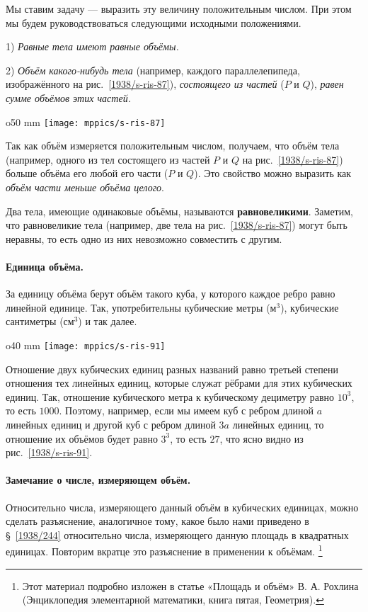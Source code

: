 Мы ставим задачу — выразить эту величину положительным числом.
При этом мы будем руководствоваться следующими исходными положениями.

1) \emph{Равные тела имеют равные объёмы.}

2) \emph{Объём какого-нибудь тела}
(например, каждого параллелепипеда, изображённого на рис.~\ref{1938/s-ris-87}),
\emph{состоящего из частей}
($P$ и $Q$),
\emph{равен сумме объёмов этих частей.}

\begin{wrapfigure}{o}{50 mm}
\vskip-0mm
\centering
\texttt{[image: mppics/s-ris-87]}
\caption{}\label{1938/s-ris-87}
\vskip-0mm
\end{wrapfigure}

Так как объём измеряется положительным числом, получаем, что 
объём тела (например, одного из тел состоящего из частей $P$ и $Q$ на рис.~\ref{1938/s-ris-87})
больше объёма его любой его части ($P$ и $Q$).
Это свойство можно выразить как \emph{объём части меньше объёма целого}.

Два тела, имеющие одинаковые объёмы, называются \textbf{равновеликими}.
Заметим, что равновеликие тела (например, две тела на рис.~\ref{1938/s-ris-87}) могут быть неравны, то есть одно из них невозможно совместить с другим.

\paragraph{Единица объёма.}\label{1938/s83}
За единицу объёма берут объём такого куба, у которого каждое ребро равно линейной единице.
Так, употребительны кубические метры (м$^3$), кубические сантиметры (см$^3$) и так далее.

\begin{wrapfigure}{o}{40 mm}
\vskip-0mm
\centering
\texttt{[image: mppics/s-ris-91]}
\caption{}\label{1938/s-ris-91}
\vskip-0mm
\end{wrapfigure}

Отношение двух кубических единиц разных названий равно третьей степени отношения тех линейных единиц, которые служат рёбрами для этих кубических единиц.
Так, отношение кубического метра к кубическому дециметру равно $10^3$, то есть $1000$.
Поэтому, например, если мы имеем куб с ребром длиной $a$ линейных единиц и другой куб с ребром длиной $3a$ линейных единиц, то отношение их объёмов будет равно $3^3$, то есть $27$, что ясно видно из рис.~\ref{1938/s-ris-91}.

\paragraph{Замечание о числе, измеряющем объём.}\label{1930/366}
Относительно числа, измеряющего данный объём в кубических единицах, можно сделать разъяснение, аналогичное тому, какое было нами приведено в §~\ref{1938/244}
относительно числа, измеряющего данную площадь в квадратных единицах.
Повторим вкратце это разъяснение в применении к объёмам.%
\footnote{Этот материал подробно изложен в статье «Площадь и объём» В. А. Рохлина (Энциклопедия элементарной математики, книга пятая, Геометрия).}


